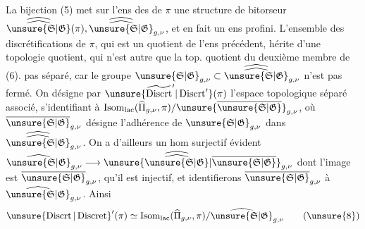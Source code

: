 La bijection (5) met sur l'ens des  de $\pi$ une structure de bitorseur  $\widehat{\widehat{\unsure{\mathfrak S|\mathfrak G}}}(\pi),\widehat{\widehat{\unsure{\mathfrak S|\mathfrak G}}}_{g,\nu}$, et    en fait un ens profini. L'ensemble des discrétifications de $\pi$, qui est un quotient de l'ens précédent, hérite d'une topologie quotient, qui n'est autre que la top. quotient du deuxième membre de (6).    pas séparé, car le groupe $\unsure{\mathfrak S|\mathfrak G}_{g,\nu}\subset\widehat{\widehat{\unsure{\mathfrak S|\mathfrak G}}}_{g,\nu}$ n'est pas fermé. On désigne par $\unsure{\widetilde{\operatorname{Discrt}}'|\operatorname{Discrt}'}(\pi)$ l'espace topologique séparé associé, s'identifiant à $\operatorname{Isom}_{\mathrm{lac}}(\widehat{\Pi}_{g,\nu},\pi)/\unsure{\overline{\unsure{\mathfrak S|\mathfrak G}}}_{g,\nu}$, où $\overline{\unsure{\mathfrak S|\mathfrak G}}_{g,\nu}$ désigne l'adhérence de $\unsure{\mathfrak S|\mathfrak G}_{g,\nu}$ dans $\widehat{\widehat{\unsure{\mathfrak S|\mathfrak G}}}_{g,\nu}$. On a d'ailleurs un hom surjectif évident $\widehat{\unsure{\mathfrak S|\mathfrak G}}_{g,\nu}\longrightarrow\unsure{\widehat{\widehat{\unsure{\mathfrak S|\mathfrak G}}}|\overline{\unsure{\mathfrak S|\mathfrak G}}}_{g,\nu}$ dont l'image est $\overline{\unsure{\mathfrak S|\mathfrak G}}_{g,\nu}$,  qu'il est injectif, et identifierons $\overline{\unsure{\mathfrak S|\mathfrak G}}_{g,\nu}$ à $\widehat{\unsure{\mathfrak S|\mathfrak G}}_{g,\nu}$. Ainsi
\[
\unsure{\operatorname{Discrt}|\operatorname{Discret}}'(\pi)\simeq\operatorname{Isom}_{\mathrm{lac}}(\widehat{\Pi}_{g,\nu},\pi)/\widehat{\unsure{\mathfrak S|\mathfrak G}}_{g,\nu}
\tag{\unsure{8}}
\]

